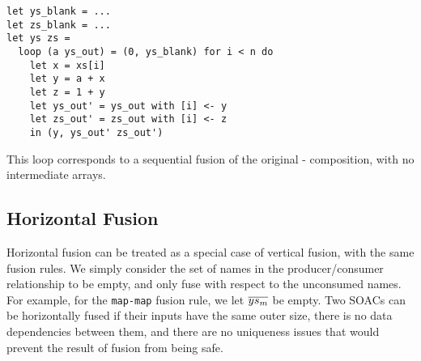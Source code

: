 \begin{lstlisting}
let ys_blank = ...
let zs_blank = ...
let ys zs =
  loop (a ys_out) = (0, ys_blank) for i < n do
    let x = xs[i]
    let y = a + x
    let z = 1 + y
    let ys_out' = ys_out with [i] <- y
    let zs_out' = zs_out with [i] <- z
    in (y, ys_out' zs_out')
\end{lstlisting}

This loop corresponds to a sequential fusion of the original
- composition, with no intermediate arrays.

\subsection{Horizontal Fusion}

Horizontal fusion can be treated as a special case of vertical fusion,
with the same fusion rules.  We simply consider the set of names in
the producer/consumer relationship to be empty, and only fuse with
respect to the unconsumed names.  For example, for the
\lstinline{map-map} fusion rule, we let $\overline{ys_{m}}$ be empty.  Two
SOACs can be horizontally fused if their inputs have the same outer
size, there is no data dependencies between them, and there are no
uniqueness issues that would prevent the result of fusion from being
safe.

